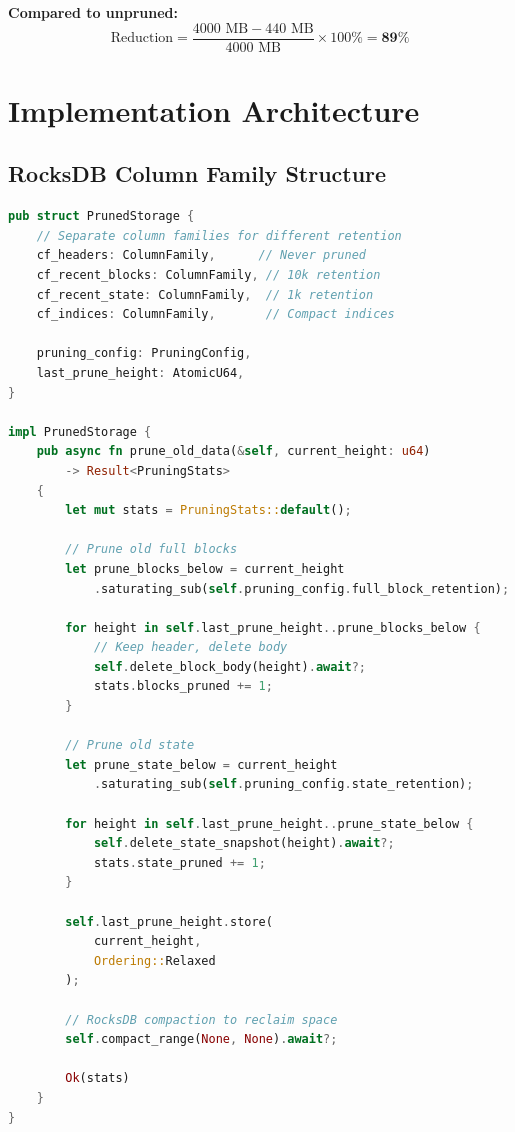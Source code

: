 \documentclass[11pt,a4paper]{article}
\begin{document}
\textbf{Compared to unpruned:}
\begin{equation}
\text{Reduction} = \frac{4000\text{ MB} - 440\text{ MB}}{4000\text{ MB}} \times 100\% = \mathbf{89\%}
\end{equation}

\section{Implementation Architecture}

\subsection{RocksDB Column Family Structure}

\begin{lstlisting}[language=Rust]
pub struct PrunedStorage {
    // Separate column families for different retention
    cf_headers: ColumnFamily,      // Never pruned
    cf_recent_blocks: ColumnFamily, // 10k retention
    cf_recent_state: ColumnFamily,  // 1k retention
    cf_indices: ColumnFamily,       // Compact indices

    pruning_config: PruningConfig,
    last_prune_height: AtomicU64,
}

impl PrunedStorage {
    pub async fn prune_old_data(&self, current_height: u64)
        -> Result<PruningStats>
    {
        let mut stats = PruningStats::default();

        // Prune old full blocks
        let prune_blocks_below = current_height
            .saturating_sub(self.pruning_config.full_block_retention);

        for height in self.last_prune_height..prune_blocks_below {
            // Keep header, delete body
            self.delete_block_body(height).await?;
            stats.blocks_pruned += 1;
        }

        // Prune old state
        let prune_state_below = current_height
            .saturating_sub(self.pruning_config.state_retention);

        for height in self.last_prune_height..prune_state_below {
            self.delete_state_snapshot(height).await?;
            stats.state_pruned += 1;
        }

        self.last_prune_height.store(
            current_height,
            Ordering::Relaxed
        );

        // RocksDB compaction to reclaim space
        self.compact_range(None, None).await?;

        Ok(stats)
    }
}
\end{lstlisting}
\end{document}

